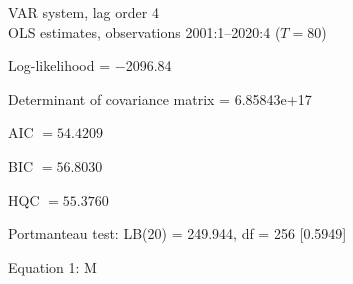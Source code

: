 \documentclass[11pt]{article}
\begin{document}
\thispagestyle{empty}

\begin{center}
VAR system, lag order 4\\
OLS estimates, observations 2001:1--2020:4 ($T=80$)
\end{center}
\noindent
Log-likelihood = $-$2096.84\par
\noindent
Determinant of covariance matrix = 6.85843\textrm{e+17}\par
\noindent
AIC $= 54.4209$ \par
\noindent
BIC $= 56.8030$ \par
\noindent
HQC $= 55.3760$ \par
\noindent
Portmanteau test: LB(20) = 249.944, df = 256 [0.5949]\par
\begin{center}

Equation 1: M\\

\vspace{1em}


\end{center}
\end{document}
